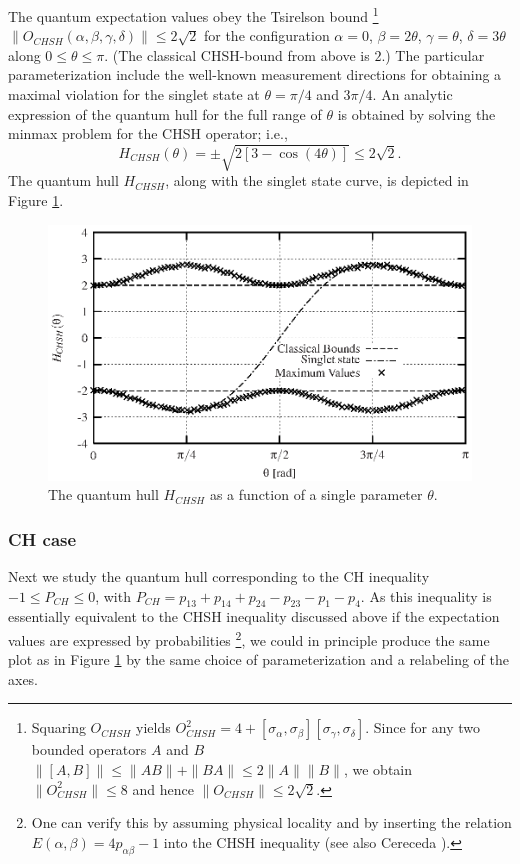 \documentclass[pra,showpacs,showkeys,amsfonts]{revtex4}
\begin{document}
The quantum expectation values
obey the Tsirelson bound
\footnote{Squaring $O_{CHSH}$ yields  \cite[p. 174]{peres}
$
  O_{CHSH}^2=4+[\sigma_\alpha,\sigma_\beta][\sigma_\gamma,\sigma_\delta]
$.
Since  for any two bounded
operators $A$ and $B$
$
  \|[A,B]\| \leq \|A B\| + \|B A\| \leq 2\|A\|\|B\|
$,
we obtain $\| O_{CHSH}^2 \| \leq 8$ and hence
$  \|O_{CHSH}\| \leq 2\sqrt{2}$.
}
$ \|O_{CHSH}(\alpha ,\beta ,\gamma ,\delta ) \|  \leq 2\sqrt{2}$
for the configuration
$\alpha=0$,
$\beta=2\theta$,
$\gamma=\theta$,
$\delta=3\theta$ along $0 \le \theta \le \pi$.
(The classical CHSH-bound from above is $2$.)
The
particular parameterization include the well-known
measurement directions for obtaining a maximal violation for the
singlet state at $\theta=\pi/4$ and $3\pi/4$.
An analytic expression of the quantum hull for the full
range of $\theta$ is obtained by solving the minmax
problem \cite[\S 90]{halmos-vs} for the CHSH operator; i.e.,
\begin{equation}
H_{CHSH}(\theta )=\pm \sqrt{2[3-\cos (4\theta )]} \le 2\sqrt{2}
.
\end{equation}
The quantum hull $H_{CHSH}$, along
with the singlet state curve, is depicted in Figure \ref{f-2003-qpoly-2}.
\begin{figure}[!ht]
  \centering
  \includegraphics{2003-qpoly-plotchsh}
  \caption{The quantum hull $H_{CHSH}$
as a function of a single parameter $\theta$.}
  \label{f-2003-qpoly-2}
\end{figure}


\subsubsection{CH case}
Next we  study the quantum hull corresponding to the CH inequality
$ -1\le P_{CH} \leq 0$,
with $
P_{CH} = p_{13} + p_{14} + p_{24} - p_{23} - p_{1} - p_{4}
$.
As this inequality is essentially equivalent to the CHSH inequality
discussed above if the expectation values are expressed by probabilities
\footnote{One can  verify this by assuming physical locality \cite{mermin-1995}
and by inserting the
  relation $E(\alpha,\beta) = 4p_{\alpha\beta} - 1$ into the CHSH
  inequality (see also Cereceda \cite{cereceda-2001}).}, we could in principle produce the same plot as in Figure
\ref{f-2003-qpoly-2} by the same choice of parameterization and a
relabeling of the axes.
\end{document}
